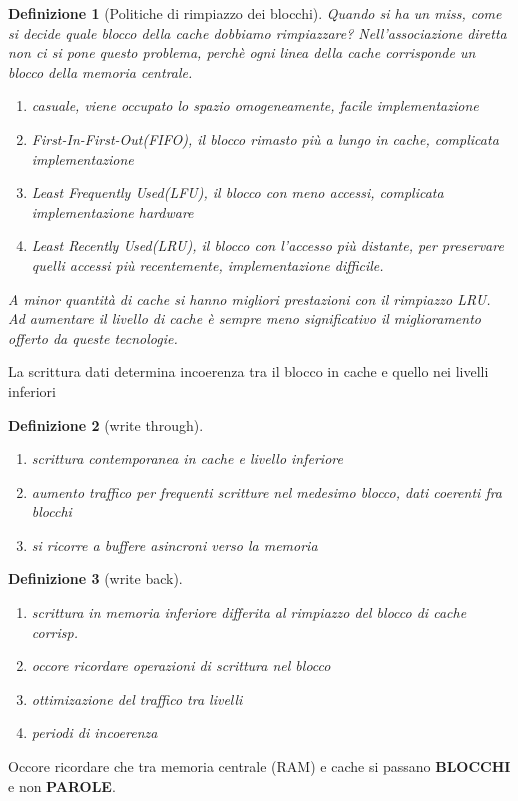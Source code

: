 \documentclass[12pt, a4paper]{article}
\theoremstyle{break}
\newtheorem{defn}{Definizione}
\theoremstyle{lemma}
\theoremstyle{lemma}
\theoremstyle{lemma}
\begin{document}
\begin{defn}[Politiche di rimpiazzo dei blocchi]
Quando si ha un miss, come si decide quale blocco della cache dobbiamo rimpiazzare?
Nell'associazione diretta non ci si pone questo problema, perchè ogni linea della cache corrisponde un blocco della memoria centrale.

\begin{enumerate}
	\item \textit{casuale}, viene occupato lo spazio omogeneamente, facile implementazione
	\item \textit{First-In-First-Out(FIFO)}, il blocco rimasto più a lungo in cache, complicata implementazione
	\item \textit{Least Frequently Used(LFU)}, il blocco con meno accessi, complicata implementazione hardware
	\item \textit{Least Recently Used(LRU)}, il blocco con l'accesso più distante, per preservare quelli accessi più recentemente, implementazione difficile.
\end{enumerate}
A minor quantità di cache si hanno migliori prestazioni con il rimpiazzo LRU. Ad aumentare il livello di cache è sempre meno significativo il miglioramento offerto da queste tecnologie.
\end{defn}

La scrittura dati determina incoerenza tra il blocco in cache e quello nei livelli inferiori
\begin{defn}[write through]
\begin{enumerate}
	\item scrittura contemporanea in cache e livello inferiore
	\item aumento traffico per frequenti scritture nel medesimo blocco, dati coerenti fra blocchi
	\item si ricorre a buffere asincroni verso la memoria
\end{enumerate}
\end{defn}

\begin{defn}[write back]
\begin{enumerate}
	\item scrittura in memoria inferiore differita al rimpiazzo del blocco di cache corrisp.
	\item occore ricordare operazioni di scrittura nel blocco
	\item ottimizazione del traffico tra livelli
	\item periodi di incoerenza
\end{enumerate}
\end{defn}
Occore ricordare che tra memoria centrale (RAM) e cache si passano \textbf{BLOCCHI} e non \textbf{PAROLE}.
\end{document}
